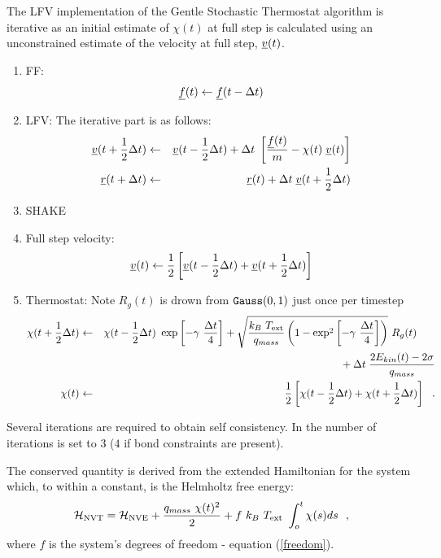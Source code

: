 The LFV implementation of the Gentle Stochastic Thermostat algorithm is
iterative as an initial estimate of $\chi (t)$ at full step is calculated using
an unconstrained estimate of the velocity at full step, $\mbox{$\underline{v}$}(t)$.
\begin{enumerate}
\item FF:
\begin{equation}
\mbox{$\underline{f}$}(t) \leftarrow \mbox{$\underline{f}$}(t - \Delta t)
\end{equation}
\item LFV: The iterative part is as follows:
\begin{eqnarray}
\mbox{$\underline{v}$}(t + {1 \over 2} \Delta t) &\leftarrow& \mbox{$\underline{v}$}(t - {1 \over 2} \Delta t) + \Delta t \;
\left[{\mbox{$\underline{f}$}(t) \over m} - \chi (t) \; \mbox{$\underline{v}$}(t) \right] \nonumber \\
\mbox{$\underline{r}$}(t + \Delta t) &\leftarrow& \mbox{$\underline{r}$}(t) + \Delta t \; \mbox{$\underline{v}$}(t + {1 \over 2} \Delta t)
\end{eqnarray}
\item SHAKE
\item Full step velocity:
\begin{equation}
\mbox{$\underline{v}$}(t) \leftarrow {1 \over 2} \left[ \mbox{$\underline{v}$}(t - {1 \over 2} \Delta t) +
\mbox{$\underline{v}$}(t + {1 \over 2} \Delta t) \right]
\end{equation}
\item Thermostat: Note $R_{g}(t)$ is drown from ${\tt Gauss}(0,1)$ just once per timestep
\begin{eqnarray}
\chi (t + {1 \over 2} \Delta t) &\leftarrow& \chi (t - {1 \over 2} \Delta t) ~ \exp \left[-\gamma~{\Delta t \over 4} \right] +
\sqrt{\frac{k_{B}~T_{\rm ext}}{q_{mass}}\left(1-\exp^{2} \left[-\gamma~{\Delta t \over 4} \right]\right)}~R_{g}(t) \phantom{xxx} \nonumber \\
& &\phantom{xxxxxxxxxxxxxxxx} + \Delta t \; {{2 E_{kin}(t) - 2 \sigma} \over q_{mass}} \nonumber \\
\chi (t) &\leftarrow& {1 \over 2} \left[ \chi (t - {1 \over 2} \Delta t) +
\chi (t + {1 \over 2} \Delta t) \right]~~.
\end{eqnarray}
\end{enumerate}
Several iterations are required to obtain self consistency.  In \D
the number of iterations is set to $3$ ($4$ if bond constraints
are present).

The conserved quantity is derived from the extended Hamiltonian for
the system which, to within a constant, is the Helmholtz free
energy:
\begin{equation}
{\cal H}_{\rm NVT} = {\cal H}_{\rm NVE} + {q_{mass}~\chi (t)^{2} \over 2} +
f~k_{B}~T_{\rm ext}~\int_o^t \chi (s) ds~~,
\end{equation}
where $f$ is the system's degrees of freedom - equation
(\ref{freedom}).

